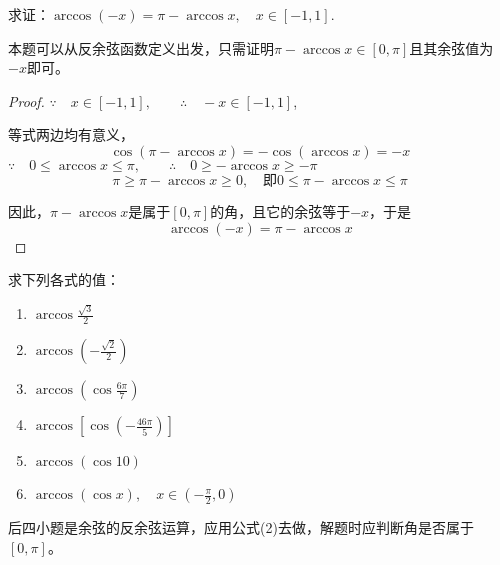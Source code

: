 \begin{example}
    求证：$\arccos(-x)=\pi-\arccos x,\quad x\in [-1,1]$.
\end{example}

\begin{analyze}
    本题可以从反余弦函数定义出发，只需证明$π-\arccos x\in[0,\pi]$且其余弦值为$-x$即可。
\end{analyze}

\begin{proof}
   $\because\quad  x\in [-1,1],\qquad \therefore\quad -x\in [-1,1]$,

等式两边均有意义，
\[\cos(\pi-\arccos x)=-\cos(\arccos x)=-x\]
$\because\quad 0\le \arccos x\le \pi, \qquad \therefore\quad 0\ge -\arccos x\ge -\pi$
\[\pi\ge \pi-\arccos x\ge 0,\quad \text{即} 0\le \pi-\arccos x\le \pi\]

因此，$\pi-\arccos x$是属于$[0,\pi]$的角，且它的余弦等于$-x$，于是
\[\arccos(-x)=\pi-\arccos x\]
\end{proof}

\begin{example}
    求下列各式的值：
\begin{multicols}{2}
\begin{enumerate}[(1)]
    \item $\arccos \frac{\sqrt{3}}{2}$
    \item $\arccos \left(-\frac{\sqrt{2}}{2}\right)$
    \item $\arccos \left(\cos\frac{6\pi}{7}\right)$
    \item $\arccos \left[\cos\left(-\frac{46\pi}{5}\right)\right]$
    \item $\arccos (\cos 10)$
    \item $\arccos (\cos x),\quad x\in\left(-\frac{\pi}{2},0\right)$
\end{enumerate}
\end{multicols}
 \end{example}   


\begin{analyze}
后四小题是余弦的反余弦运算，应用公式(2)去做，解题时应判断角是否属于$[0,\pi]$。
\end{analyze}

